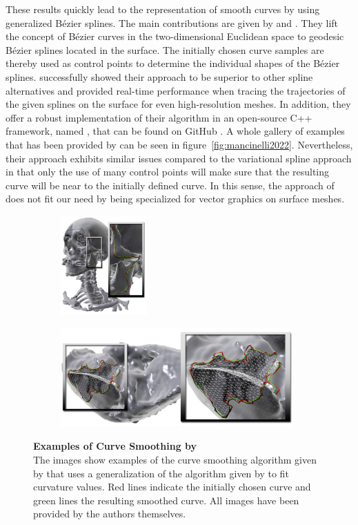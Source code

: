 \documentclass{stdlocal}
\begin{document}
These results quickly lead to the representation of smooth curves by using generalized Bézier splines.
The main contributions are given by \textcite{martinez2007} and \textcite{mancinelli2022}.
They lift the concept of Bézier curves in the two-dimensional Euclidean space to geodesic Bézier splines located in the surface.
The initially chosen curve samples are thereby used as control points to determine the individual shapes of the Bézier splines.
\textcite{mancinelli2022} successfully showed their approach to be superior to other spline alternatives and provided real-time performance when tracing the trajectories of the given splines on the surface for even high-resolution meshes.
In addition, they offer a robust implementation of their algorithm in an open-source C++ framework, named  \autocite{agus2019}, that can be found on GitHub .
A whole gallery of examples that has been provided by \textcite{mancinelli2022} can be seen in figure~\ref{fig:mancinelli2022}.
Nevertheless, their approach exhibits similar issues compared to the variational spline approach in that only the use of many control points will make sure that the resulting curve will be near to the initially defined curve.
In this sense, the approach of \textcite{mancinelli2022} does not fit our need by being specialized for vector graphics on surface meshes.

\begin{figure}[t]
  \centering
  \begin{subfigure}[b]{0.29\linewidth}
    \centering
    \includegraphics[height=3.8cm]{images/lawonn2014-1.png}
  \end{subfigure}
  \begin{subfigure}[b]{0.69\linewidth}
    \centering
    \includegraphics[height=3.8cm]{images/lawonn2014-2.png}
  \end{subfigure}
  \caption[Examples of Curve Smoothing by \textcite{lawonn2014}]{%
    \textbf{Examples of Curve Smoothing by \textcite{lawonn2014}}\\
    The images show examples of the curve smoothing algorithm given by \textcite{lawonn2014} that uses a generalization of the algorithm given by \textcite{martinez2005} to fit curvature values.
    Red lines indicate the initially chosen curve and green lines the resulting smoothed curve.
    All images have been provided by the authors themselves.
  }
  \label{fig:lawonn2014}
\end{figure}
\end{document}
